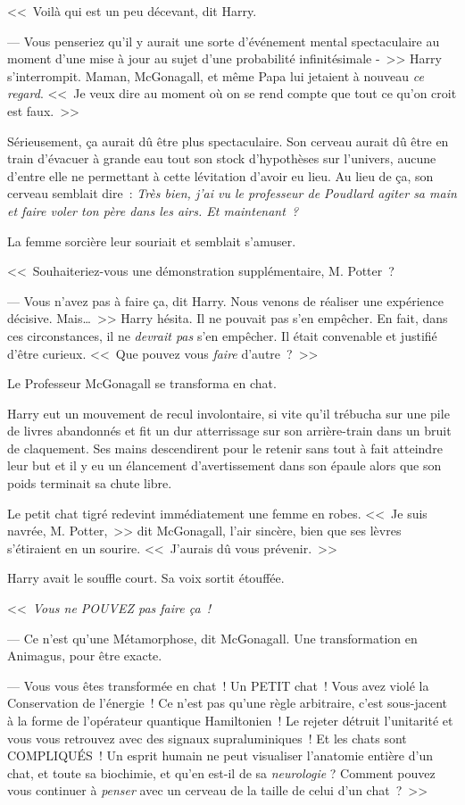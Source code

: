 <<~Voilà qui est un peu décevant, dit Harry.

--- Vous penseriez qu'il y aurait une sorte d'événement mental spectaculaire au moment d'une mise à jour au sujet d'une probabilité infinitésimale -~>> Harry s'interrompit. Maman, McGonagall, et même Papa lui jetaient à nouveau \emph{ce regard}. <<~Je veux dire au moment où on se rend compte que tout ce qu'on croit est faux.~>>

Sérieusement, ça aurait dû être plus spectaculaire. Son cerveau aurait dû être en train d'évacuer à grande eau tout son stock d'hypothèses sur l'univers, aucune d'entre elle ne permettant à cette lévitation d'avoir eu lieu. Au lieu de ça, son cerveau semblait dire~: \emph{Très bien, j'ai vu le professeur de Poudlard agiter sa main et faire voler ton père dans les airs. Et maintenant~?}

La femme sorcière leur souriait et semblait s'amuser.

<<~Souhaiteriez-vous une démonstration supplémentaire, M. Potter~?

--- Vous n'avez pas à faire ça, dit Harry. Nous venons de réaliser une expérience décisive. Mais\ldots~>> Harry hésita. Il ne pouvait pas s'en empêcher. En fait, dans ces circonstances, il ne \emph{devrait pas} s'en empêcher. Il était convenable et justifié d'être curieux. <<~Que pouvez vous \emph{faire} d'autre~?~>>

Le Professeur McGonagall se transforma en chat.

Harry eut un mouvement de recul involontaire, si vite qu'il trébucha sur une pile de livres abandonnés et fit un dur atterrissage sur son arrière-train dans un bruit de claquement. Ses mains descendirent pour le retenir sans tout à fait atteindre leur but et il y eu un élancement d'avertissement dans son épaule alors que son poids terminait sa chute libre.

Le petit chat tigré redevint immédiatement une femme en robes. <<~Je suis navrée, M. Potter,~>> dit McGonagall, l'air sincère, bien que ses lèvres s'étiraient en un sourire. <<~J'aurais dû vous prévenir.~>>

Harry avait le souffle court. Sa voix sortit étouffée.

<<~\emph{Vous ne POUVEZ pas faire ça~!}

--- Ce n'est qu'une Métamorphose, dit McGonagall. Une transformation en Animagus, pour être exacte.

--- Vous vous êtes transformée en chat~! Un PETIT chat~! Vous avez violé la Conservation de l'énergie~! Ce n'est pas qu'une règle arbitraire, c'est sous-jacent à la forme de l'opérateur quantique Hamiltonien~! Le rejeter détruit l'unitarité et vous vous retrouvez avec des signaux supraluminiques~! Et les chats sont COMPLIQUÉS~! Un esprit humain ne peut visualiser l'anatomie entière d'un chat, et toute sa biochimie, et qu'en est-il de sa \emph{neurologie} ? Comment pouvez vous continuer à \emph{penser} avec un cerveau de la taille de celui d'un chat~?~>>

